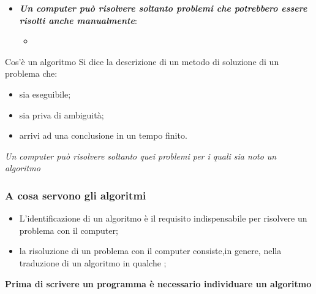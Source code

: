 \begin{frame}
\begin{block}{}
\begin{itemize}
\item \textbf{\textit{Un computer può risolvere soltanto problemi che potrebbero essere risolti anche manualmente}}:
\begin{itemize}
\item {}
\end{itemize}
\end{itemize}
\end{block}
\pause
\begin{block}{Cos'è un algoritmo}
Si dice  la \alert{descrizione} di un metodo di soluzione di un problema che:
\begin{itemize}
\item sia eseguibile;
\item sia priva di ambiguità;
\item arrivi ad una conclusione in un tempo finito.
\end{itemize}
\end{block}
\pause
\begin{block}{}
\textit{Un computer può risolvere soltanto quei problemi per i quali sia noto un algoritmo}
\end{block}
\end{frame}

\begin{frame}
\frametitle{A cosa servono gli algoritmi}
\begin{block}{}
\begin{itemize}
\item L'identificazione di un algoritmo è il requisito indispensabile per risolvere un problema con il computer;
\item la risoluzione di un problema con il computer consiste,in genere, nella traduzione di un algoritmo in qualche
;
\end{itemize}
\end{block}
\pause
\begin{block}{}
\begin{center}
\large{\textbf{Prima di scrivere un programma è necessario individuare un algoritmo}}
\end{center}
\end{block}
\end{frame}

